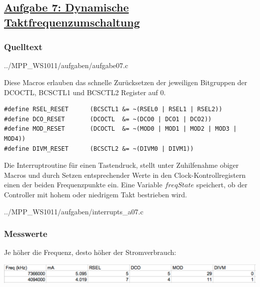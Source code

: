 \subsection*
{\href{http://cst.mi.fu-berlin.de/intern/19606-P-MPP/Aufgaben/040203.html}
{Aufgabe 7: Dynamische Taktfrequenzumschaltung}}

\subsubsection*{Quelltext}


{../MPP_WS1011/aufgaben/aufgabe07.c}

Diese Macros erlauben das schnelle Zurücksetzen der jeweiligen Bitgruppen der DCOCTL, BCSCTL1 und BCSCTL2 Register auf 0.

\begin{lstlisting}[caption=Macros]
#define RSEL_RESET      (BCSCTL1 &= ~(RSEL0 | RSEL1 | RSEL2))
#define DCO_RESET       (DCOCTL  &= ~(DCO0 | DCO1 | DCO2))
#define MOD_RESET       (DCOCTL  &= ~(MOD0 | MOD1 | MOD2 | MOD3 | MOD4))
#define DIVM_RESET      (BCSCTL2 &= ~(DIVM0 | DIVM1))
\end{lstlisting}

Die Interruptroutine für einen Tastendruck, stellt unter Zuhilfenahme obiger Macros und durch Setzen entsprechender Werte in den Clock-Kontrollregistern einen der beiden Frequenzpunkte ein. Eine Variable $freqState$ speichert, ob der Controller mit hohem oder niedrigem Takt bestrieben wird.


{../MPP_WS1011/aufgaben/interrupts_a07.c}

\subsubsection*{Messwerte}

Je höher die Frequenz, desto höher der Stromverbrauch:

\includegraphics[width=\textwidth]{aufgaben/07/CLK.pdf}

